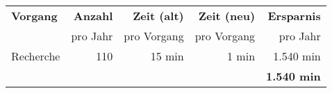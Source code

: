 \begin{tabular}{lrrrr}
    \rowcolor{heading}\textbf{Vorgang}  & \textbf{Anzahl} & \textbf{Zeit (alt)} & \textbf{Zeit (neu)} & \textbf{Ersparnis}\\
    \rowcolor{heading}\textbf{}         & pro Jahr        & pro Vorgang         & pro Vorgang         & pro Jahr\\
    \rowcolor{odd} Recherche          & 110             & 15 min              & 1 min               & 1.540 min\\
    \hline
    \hline
    \rowcolor{heading}\textbf{} & \textbf{} & \textbf{} & \textbf{} & \textbf{1.540 min} \\
    \end{tabular}